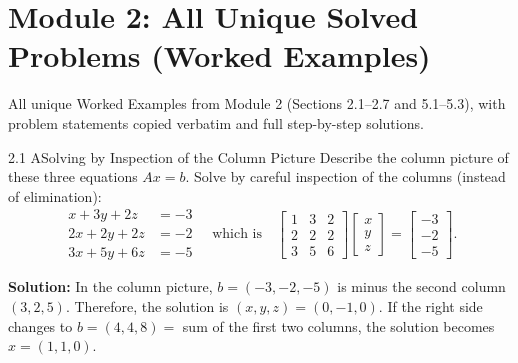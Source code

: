\documentclass[11pt,a4paper,openany,oneside]{book}
\def\vect#1{#1}%
\def\mathbf#1{#1}%
\newcommand{\vect}[1]{\mathbf{#1}}
\numberwithin{equation}{chapter}
\begin{document}
\chapter[Module 2: Unique Solved Problems]{Module 2: All Unique Solved Problems (Worked Examples)}

\begin{syll}
All unique Worked Examples from Module 2 (Sections 2.1--2.7 and 5.1--5.3), with problem statements copied verbatim and full step-by-step solutions.
\end{syll}

\begin{example}{2.1 A}{Solving by Inspection of the Column Picture}
Describe the column picture of these three equations $A\vect{x} = \vect{b}$. Solve by careful inspection of the columns (instead of elimination):
\[
\begin{aligned}
x + 3y + 2z &= -3 \\
2x + 2y + 2z &= -2 \\
3x + 5y + 6z &= -5
\end{aligned}
\quad \text{which is} \quad
\begin{bmatrix} 1 & 3 & 2 \\ 2 & 2 & 2 \\ 3 & 5 & 6 \end{bmatrix} \begin{bmatrix} x \\ y \\ z \end{bmatrix} = \begin{bmatrix} -3 \\ -2 \\ -5 \end{bmatrix}.
\]
\end{example}
\textbf{Solution:} In the column picture, $\vect{b} = (-3,-2,-5)$ is minus the second column $(3,2,5)$. Therefore, the solution is $(x,y,z) = (0,-1,0)$. If the right side changes to $\vect{b} = (4,4,8) =$ sum of the first two columns, the solution becomes $\vect{x} = (1,1,0)$.
\end{document}
